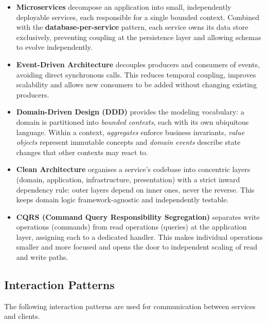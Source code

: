 \begin{itemize}
  \item \textbf{Microservices} decompose an application into small, independently deployable services, each responsible for a single bounded context. Combined with the \textbf{database-per-service} pattern, each service owns its data store exclusively, preventing coupling at the persistence layer and allowing schemas to evolve independently.

  \item \textbf{Event-Driven Architecture} decouples producers and consumers of events, avoiding direct synchronous calls. This reduces temporal coupling, improves scalability and allows new consumers to be added without changing existing producers.

  \item \textbf{Domain-Driven Design (DDD)} provides the modeling vocabulary: a domain is partitioned into \textit{bounded contexts}, each with its own ubiquitous language. Within a context, \textit{aggregates} enforce business invariants, \textit{value objects} represent immutable concepts and \textit{domain events} describe state changes that other contexts may react to.

  \item \textbf{Clean Architecture} organises a service's codebase into concentric layers (domain, application, infrastructure, presentation) with a strict inward dependency rule: outer layers depend on inner ones, never the reverse. This keeps domain logic framework-agnostic and independently testable.

  \item \textbf{CQRS (Command Query Responsibility Segregation)} separates write operations (commands) from read operations (queries) at the application layer, assigning each to a dedicated handler. This makes individual operations smaller and more focused and opens the door to independent scaling of read and write paths.
\end{itemize}

\subsection{Interaction Patterns}

The following interaction patterns are used for communication between services and clients.

